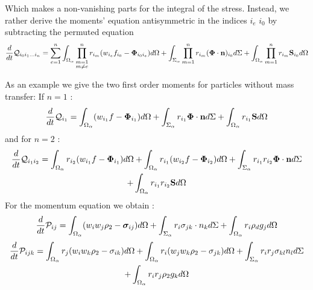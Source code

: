 Which makes a non-vanishing parts for the integral of the stress. 
Instead, we rather derive the moments' equation antisymmetric in the indices $i_e$ $i_0$ by subtracting the permuted equation
\begin{multline}
    \frac{d}{dt}{ \mathcal{Q}_{i_0 i_1\ldots i_n }}
    = \sum_{e=1}^{n} \int_{\Omega_\alpha} \prod^{n}_{\substack{ m=1 \\   m \neq e}} r_{i_m} (w_{i_e}f_{i_0}  - \mathbf{\Phi}_{i_0 i_e})d\Omega
    +\int_{\Sigma_\alpha} \prod_{m=1}^{n} r_{i_m} (\mathbf{\Phi} \cdot \textbf{n})_{i_0}d\Sigma
    + \int_{\Omega_\alpha} \prod_{m=1}^{n} r_{i_m} \textbf{S}_{i_0} d\Omega
\end{multline}

As an example we give the two first order moments for particles without mass transfer: 
If $n=1$ : 
\begin{equation}
    \frac{d}{dt}{ \mathcal{Q}_{i_1}}
    = \int_{\Omega_\alpha} (w_{i_1}f  - \mathbf{\Phi}_{i_1})d\Omega
    +\int_{\Sigma_\alpha} r_{i_1}\mathbf{\Phi} \cdot \textbf{n}d\Sigma
    + \int_{\Omega_\alpha}r_{i_1} \textbf{S} d\Omega
\end{equation}
and for $n=2$ : 
\begin{multline}
    \label{eq:moment_n2}
    \frac{d}{dt} {\mathcal{Q}_{i_1 i_2}}
    = 
    \int_{\Omega_\alpha} r_{i_2} (w_{i_1}f  - \mathbf{\Phi}_{i_1})d\Omega
    +\int_{\Omega_\alpha} r_{i_1} (w_{i_2}f  - \mathbf{\Phi}_{i_2})d\Omega
    +\int_{\Sigma_\alpha}  r_{i_1}r_{i_2} \mathbf{\Phi} \cdot \textbf{n}d\Sigma\\
    + \int_{\Omega_\alpha} r_{i_1}r_{i_2}  \textbf{S} d\Omega
\end{multline}
For the momentum equation we obtain : 
\begin{equation}
    \frac{d}{dt}{ \mathcal{P}_{ij}}
    = \int_{\Omega_\alpha} (w_{i}w_j \rho_2  - \bm{\sigma}_{ij})d\Omega
    +\int_{\Sigma_\alpha} r_{i} \sigma_{jk} \cdot n_k d\Sigma
    + \int_{\Omega_\alpha}r_{i} \rho_d g_j d\Omega
\end{equation}
\begin{multline}
    \frac{d}{dt}{ \mathcal{P}_{i j k}}
    = 
    \int_{\Omega_\alpha} r_{j} (w_{i} w_k\rho_2 - \sigma_{ik})d\Omega
    +\int_{\Omega_\alpha} r_{i} (w_{j} w_k\rho_2 - \sigma_{jk})d\Omega
    +\int_{\Sigma_\alpha}  r_{i}r_{j} \sigma_{kl} n_l d\Sigma\\
    + \int_{\Omega_\alpha} r_{i}r_{j}  \rho_2 g_k d\Omega
    \label{eq:second_momoent_of_momentum}
\end{multline}


